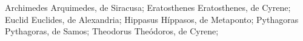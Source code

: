\DefFriend Archimedes       Arquimedes, de Siracusa;
\DefFriend Eratosthenes     Eratosthenes, de Cyrene; %
\DefFriend Euclid           Euclides, de Alexandria;
\DefFriend Hippasus         Híppasos, de Metaponto; %
\DefFriend Pythagoras       Pythagoras, de Samos; %
\DefFriend Theodorus        Theódoros, de Cyrene; %
